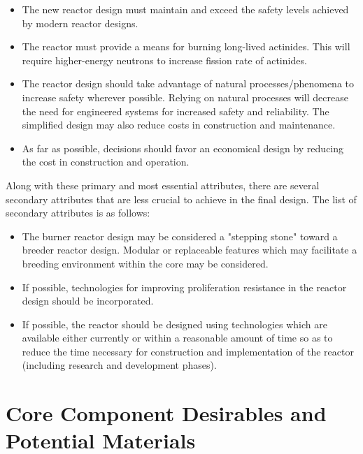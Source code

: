 \documentclass[]{report}
\begin{document}
\begin{itemize} 
  \item The new reactor design must maintain and exceed the safety levels achieved by modern reactor designs.
  \item The reactor must provide a means for burning long-lived actinides.  This will require higher-energy neutrons to increase fission rate of actinides.
  \item The reactor design should take advantage of natural processes/phenomena to increase safety wherever possible.  Relying on natural processes will decrease the need for engineered systems for increased safety and reliability.  The simplified design may also reduce costs in construction and maintenance.
  \item As far as possible, decisions should favor an economical design by reducing the cost in construction and operation.
\end{itemize}

Along with these primary and most essential attributes, there are several secondary attributes that are less crucial to achieve in the final design.  The list of secondary attributes is as follows:
\begin{itemize}
  \item The burner reactor design may be considered a "stepping stone" toward a breeder reactor design.  Modular or replaceable features which may facilitate a breeding environment within the core may be considered.
  \item If possible, technologies for improving proliferation resistance in the reactor design should be incorporated.
  \item If possible, the reactor should be designed using technologies which are available either currently or within a reasonable amount of time so as to reduce the time necessary for construction and implementation of the reactor (including research and development phases).
\end{itemize}

\section{Core Component Desirables and Potential Materials}
\end{document}
